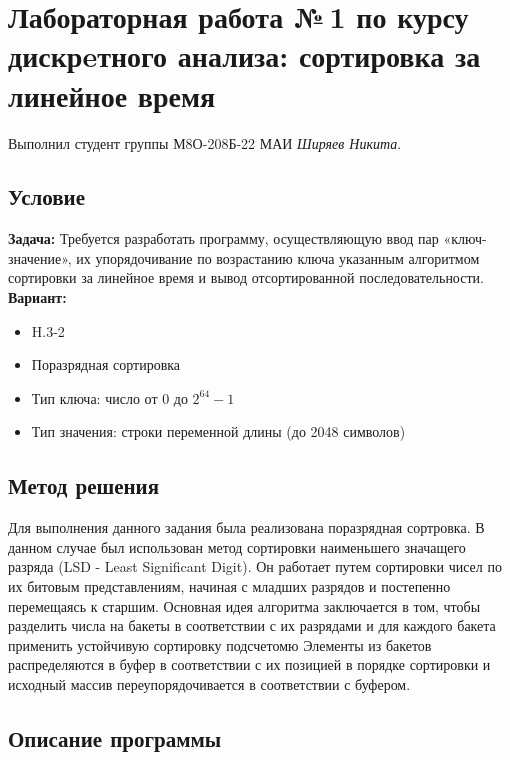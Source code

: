 \documentclass[12pt]{article}
\begin{document}
\section*{Лабораторная работа №\,1 по курсу дискрeтного анализа: сортировка за линейное время}

Выполнил студент группы М8О-208Б-22 МАИ \textit{Ширяев Никита}.

\subsection*{Условие}

\textbf{Задача:}
Требуется разработать программу, осуществляющую ввод пар «ключ-значение», их упорядочивание по возрастанию ключа указанным алгоритмом сортировки за линейное время и вывод отсортированной последовательности.\newline
\newline
\textbf{Вариант:}
\begin{itemize}
    \item H.3-2
    \item Поразрядная сортировка
    \item Тип ключа: число от 0 до $2^{64} - 1$
    \item Тип значения: строки переменной длины (до 2048 символов)
\end{itemize}


\subsection*{Метод решения}

Для выполнения данного задания была реализована поразрядная сортровка. В данном случае был использован  метод сортировки наименьшего значащего разряда (LSD - Least Significant Digit). Он работает путем сортировки чисел по их битовым представлениям, начиная с младших разрядов и постепенно перемещаясь к старшим.
Основная идея алгоритма заключается в том, чтобы разделить числа на бакеты в соответствии с их разрядами и для каждого бакета применить устойчивую сортировку подсчетомю Элементы из бакетов распределяются в буфер в соответствии с их позицией в порядке сортировки и исходный массив переупорядочивается в соответствии с буфером.

\subsection*{Описание программы}
\end{document}
